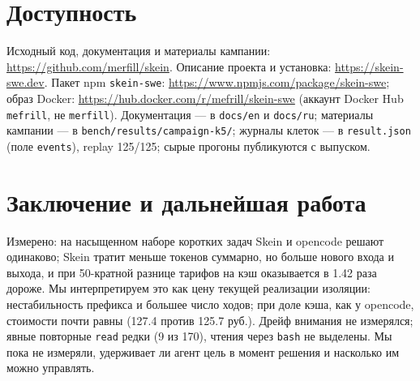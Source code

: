 \documentclass[11pt,a4paper]{article}
\begin{document}
\section{Доступность}

Исходный код, документация и материалы кампании:
\url{https://github.com/merfill/skein}. Описание проекта и установка:
\url{https://skein-swe.dev}. Пакет npm \texttt{skein-swe}:
\url{https://www.npmjs.com/package/skein-swe}; образ Docker:
\url{https://hub.docker.com/r/mefrill/skein-swe} (аккаунт Docker Hub \texttt{mefrill}, не
\texttt{merfill}). Документация --- в \texttt{docs/en} и \texttt{docs/ru}; материалы
кампании --- в \texttt{bench/results/campaign-k5/}; журналы клеток --- в \texttt{result.json}
(поле \texttt{events}), replay 125/125; сырые прогоны публикуются с выпуском.

\section{Заключение и дальнейшая работа}
\label{sec:future}

Измерено: на насыщенном наборе коротких задач Skein и opencode решают одинаково; Skein
тратит меньше токенов суммарно, но больше нового входа и выхода, и при 50-кратной разнице
тарифов на кэш оказывается в 1.42 раза дороже. Мы интерпретируем это как цену текущей
реализации изоляции: нестабильность префикса и большее число ходов; при доле кэша, как у
opencode, стоимости почти равны (127.4 против 125.7 руб.). Дрейф внимания не измерялся; явные
повторные \texttt{read} редки (9 из 170), чтения через \texttt{bash} не выделены. Мы пока не
измеряли, удерживает ли агент цель в момент решения и насколько им можно управлять.
\end{document}
